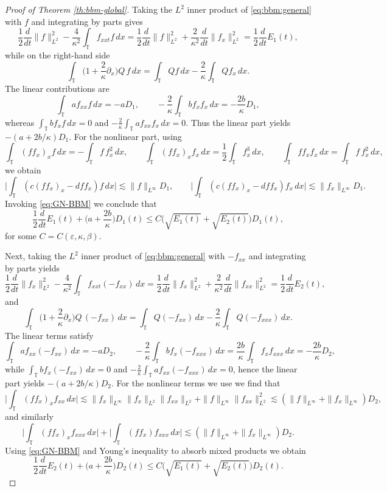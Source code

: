 \documentclass[10pt,a4paper]{amsart}
\newcommand{\TT}{\mathbb T}
\begin{document}
\begin{proof}[Proof of Theorem \ref{th:bbm-global}]
	Taking the $L^2$ inner product of \eqref{eq:bbm:general} with $f$ and integrating by parts gives
	\[
	\frac12\frac{d}{dt}\|f\|_{L^2}^2-\frac{4}{\kappa^2}\int_\TT f_{xxt}f\,dx
	=\frac12\frac{d}{dt}\|f\|_{L^2}^2+\frac{2}{\kappa^2}\frac{d}{dt}\|f_x\|_{L^2}^2
	=\frac12\frac{d}{dt}E_1(t),
	\]
	while on the right-hand side
	\[
	\int_\TT\Big(1+\frac{2}{\kappa}\partial_x\Big)Q\,f\,dx
	=\int_\TT Q f\,dx-\frac{2}{\kappa}\int_\TT Q f_x\,dx.
	\]
	The linear contributions are
	\[
	\int_\TT a f_{xx}f\,dx=-aD_1,\qquad
	-\frac{2}{\kappa}\int_\TT b f_x f_x\,dx=-\frac{2b}{\kappa}D_1,
	\]
	whereas $\int_\TT b f_x f\,dx=0$ and $-\frac{2}{\kappa}\int_\TT a f_{xx} f_x\,dx=0$. Thus the linear part yields
	$-(a+2b/\kappa)D_1$. For the nonlinear part, using
	\[
	\int_\TT (ff_x)_x f\,dx=-\int_\TT f\,f_x^2\,dx,\qquad
	\int_\TT (ff_x)_x f_x\,dx=\frac12\int_\TT f_x^3\,dx,\qquad
	\int_\TT f f_x f_x\,dx=\int_\TT f\,f_x^2\,dx,
	\]
	we obtain
	\[
	\Big|\int_\TT (c(ff_x)_x-dff_x)f\,dx\Big|\lesssim \|f\|_{L^\infty}D_1,\qquad
	\Big|\int_\TT (c(ff_x)_x-dff_x)f_x\,dx\Big|\lesssim \|f_x\|_{L^\infty}D_1.
	\]
	Invoking \eqref{eq:GN-BBM} we conclude that
	\begin{equation}\label{ineq:E1}
		\frac12\frac{d}{dt}E_1(t)+\Big(a+\frac{2b}{\kappa}\Big)D_1(t)
		\le C\big(\sqrt{E_1(t)}+\sqrt{E_2(t)}\big)D_1(t),
	\end{equation}
	for some $C=C(\varepsilon,\kappa,\beta)$. \medskip
		
	Next, taking the $L^2$ inner product of \eqref{eq:bbm:general} with $-f_{xx}$ and integrating by parts yields
	\[
	\frac12\frac{d}{dt}\|f_x\|_{L^2}^2-\frac{4}{\kappa^2}\int_\TT f_{xxt}(-f_{xx})\,dx
	=\frac12\frac{d}{dt}\|f_x\|_{L^2}^2+\frac{2}{\kappa^2}\frac{d}{dt}\|f_{xx}\|_{L^2}^2
	=\frac12\frac{d}{dt}E_2(t),
	\]
	and
	\[
	\int_\TT\Big(1+\frac{2}{\kappa}\partial_x\Big)Q\,(-f_{xx})\,dx
	=\int_\TT Q(-f_{xx})\,dx-\frac{2}{\kappa}\int_\TT Q(-f_{xxx})\,dx.
	\]
	The linear terms satisfy
	\[
	\int_\TT a f_{xx}(-f_{xx})\,dx=-aD_2,\qquad
	-\frac{2}{\kappa}\int_\TT b f_x(-f_{xxx})\,dx
	=\frac{2b}{\kappa}\int_\TT f_x f_{xxx}\,dx=-\frac{2b}{\kappa}D_2,
	\]
	while $\int_\TT b f_x(-f_{xx})\,dx=0$ and $-\frac{2}{\kappa}\int_\TT a f_{xx}(-f_{xxx})\,dx=0$, hence the linear part yields
	$-(a+2b/\kappa)D_2$. For the nonlinear terms we use we find that
	\[
	\Big|\int_\TT (ff_x)_x f_{xx}\,dx\Big|
	\lesssim \|f_x\|_{L^\infty}\|f_x\|_{L^2}\|f_{xx}\|_{L^2}+\|f\|_{L^\infty}\|f_{xx}\|_{L^2}^2
	\lesssim (\|f\|_{L^\infty}+\|f_x\|_{L^\infty})D_2,
	\]
	and similarly
	\[
	\Big|\int_\TT (ff_x)_x f_{xxx}\,dx\Big|
	+\Big|\int_\TT (f f_x) f_{xxx}\,dx\Big|
	\lesssim (\|f\|_{L^\infty}+\|f_x\|_{L^\infty})D_2.
	\]
	Using \eqref{eq:GN-BBM} and Young's inequality to absorb mixed products we obtain
	\begin{equation}\label{ineq:E2}
		\frac12\frac{d}{dt}E_2(t)+\Big(a+\frac{2b}{\kappa}\Big)D_2(t)
		\le C\big(\sqrt{E_1(t)}+\sqrt{E_2(t)}\big)D_2(t).
	\end{equation}
	

\end{proof}
\end{document}
